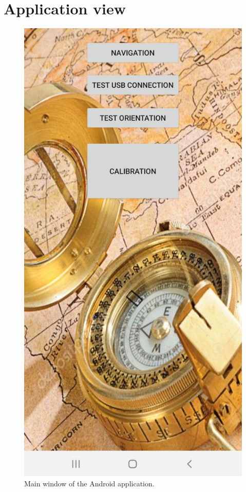 \chapter{Application view}
\label{app:app_view}

\begin{figure}[H]
	\centering
	\includegraphics[width=.4\linewidth]{Images/app_main.jpg}
	\caption{Main window of the Android application.}
	\label{fig:android_app}
\end{figure}